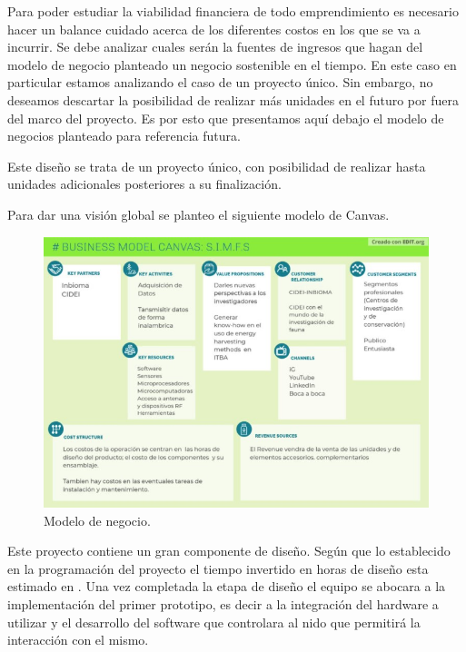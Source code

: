 Para poder estudiar la viabilidad financiera de todo emprendimiento es necesario hacer un balance cuidado acerca de los diferentes costos en los que se va a incurrir. Se debe analizar cuales serán la fuentes de ingresos que hagan del modelo de negocio planteado un negocio sostenible en el tiempo. 
En este caso en particular estamos analizando el caso de un proyecto único. Sin embargo, no deseamos descartar la posibilidad de realizar más unidades en el futuro por fuera del marco del proyecto. Es por esto que presentamos aquí debajo el modelo de negocios planteado para referencia futura. 

Este diseño se trata de un proyecto único, con posibilidad de realizar hasta \TBD unidades adicionales posteriores a su finalización.

Para dar una visión global se planteo el siguiente modelo de Canvas.
 

\begin{figure}[H]
	\centering
	\includegraphics[scale=0.7]{../Factibilidad/ImagenesFactibilidad/ModeloDeCanvas}
	\caption{Modelo de negocio.}
	\label{fig:modelodecanvas}
\end{figure}



Este proyecto contiene un gran componente de diseño. Según que lo establecido en la programación del proyecto el tiempo invertido en horas de diseño esta estimado en  \TBD. 
Una vez completada la etapa de diseño el equipo se abocara a la implementación del primer prototipo, es decir a la integración del hardware a utilizar y el desarrollo del software que controlara al nido que permitirá la interacción con el mismo. 


